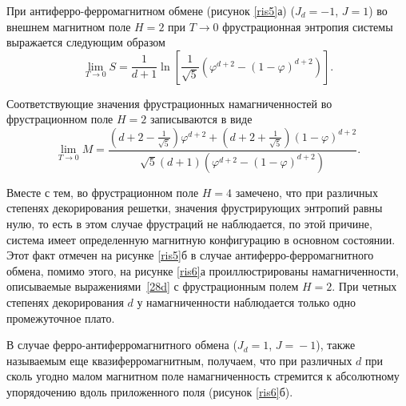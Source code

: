 
При антиферро-ферромагнитном обмене (рисунок \ref{ris5}а) ($J_d=-1$, $J=1$) во внешнем магнитном поле $H=2$ при $T\rightarrow 0$ фрустрационная энтропия системы выражается следующим образом
\begin{equation}
\lim_{T \rightarrow 0} S = \frac{1}{d+1} \ln \left[\frac{1}{\sqrt{5}}\left(\varphi^{d+2}-(1-\varphi)^{d+2}\right)\right].
\label{27d}
\end{equation}

Соответствующие значения фрустрационных намагниченностей во фрустрационном поле $H=2$ записываются в виде
\begin{equation}
\lim_{T \rightarrow 0} M = \frac{\left(d+2-\frac{1}{\sqrt{5}}\right)\varphi^{d+2}+\left(d+2+\frac{1}{\sqrt{5}}\right)(1-\varphi)^{d+2}}{\sqrt{5}(d+1)(\varphi^{d+2}-(1-\varphi)^{d+2})}.
\label{28d}
\end{equation}

Вместе с тем, во фрустрационном поле $H=4$ замечено, что при различных степенях декорирования решетки, значения фрустрирующих энтропий равны нулю, то есть в этом случае фрустраций не наблюдается, по этой причине, система имеет определенную магнитную конфигурацию в основном состоянии. Этот факт отмечен на рисунке \ref{ris5}б в случае антиферро-ферромагнитного обмена, помимо этого, на рисунке \ref{ris6}а проиллюстрированы намагниченности, описываемые выражениями~\eqref{28d} с фрустрационным полем $H=2$. При четных степенях декорирования $d$ у намагниченности наблюдается только одно промежуточное плато. 

В случае ферро-антиферромагнитного обмена (\mbox{$J_d=1$}, $J\!\!=\!\!-1$), также называемым еще квазиферромагнитным, получаем, что при различных $d$ при сколь угодно малом магнитном поле намагниченность стремится к абсолютному упорядочению вдоль приложенного поля (рисунок \ref{ris6}б). 

